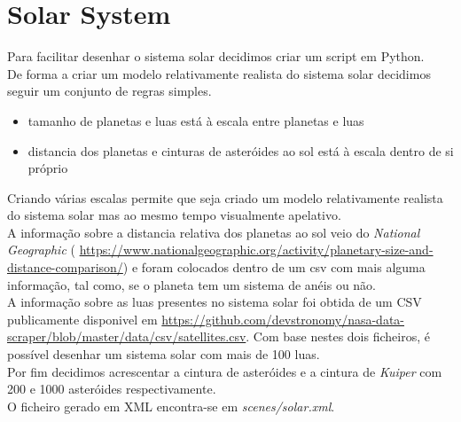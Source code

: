 \documentclass[a4paper]{report}
\begin{document}
\chapter{Solar System}
Para facilitar desenhar o sistema solar decidimos criar um script em Python.\\
De forma a criar um modelo relativamente realista do sistema solar decidimos
seguir um conjunto de regras simples.

\begin{itemize}
        \item tamanho de planetas e luas está à escala entre planetas e luas
        \item distancia dos planetas e cinturas de asteróides ao sol está à
            escala dentro de si próprio
\end{itemize}
Criando várias escalas permite que seja criado um modelo relativamente realista
do sistema solar mas ao mesmo tempo visualmente apelativo.\\
A informação sobre a distancia relativa dos planetas ao sol veio do
\textit{National Geographic} (
\url{https://www.nationalgeographic.org/activity/planetary-size-and-distance-comparison/})
e foram colocados dentro de um csv com mais alguma informação, tal como, se o
planeta tem um sistema de anéis ou não.\\
A informação sobre as luas presentes no sistema solar foi obtida de um CSV
publicamente disponivel em
\url{https://github.com/devstronomy/nasa-data-scraper/blob/master/data/csv/satellites.csv}.
Com base nestes dois ficheiros, é possível desenhar um sistema solar com mais de
100 luas.\\
Por fim decidimos acrescentar a cintura de asteróides e a cintura de
\textit{Kuiper} com 200 e 1000 asteróides respectivamente.\\
O ficheiro gerado em XML encontra-se em \textit{scenes/solar.xml}.
\end{document}

